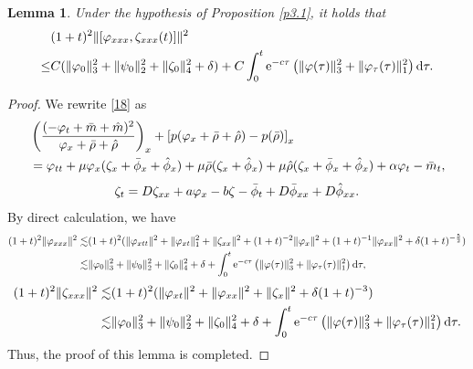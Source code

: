 \documentclass[11pt]{article}
\theoremstyle{plain}
\newtheorem{lemma}{Lemma}[section]
\numberwithin{equation}{section}
\begin{document}
\begin{lemma}\label{lem53}
		Under the hypothesis of Proposition \ref{p3.1}, it holds that
		\begin{align}\label{13.72}
			&(1+t)^2\|[\varphi_{xxx},\zeta_{xxx}(t)]\|^2\notag\\ 
			\leq& C(\|\varphi_0\|_3^2+\|\psi_0\|_2^2+\|\zeta_0\|_4^2+\delta)+C\int_{0}^{t}{\rm e}^{-c\tau}\left(\|\varphi(\tau)\|_3^2+\|\varphi_{\tau}(\tau)\|_1^2\right){\rm d}\tau.
		\end{align}
	\end{lemma}
\begin{proof}
We rewrite \eqref{18} as
\begin{align}\notag
	&\displaystyle\left(\frac{(-\varphi_{t}+\bar m+\hat m)^2}{\varphi_x+\bar\rho+\hat\rho}\right)_{x}+\left[p(\varphi_x+\bar\rho+\hat\rho)-p(\bar\rho)\right]_{x}\notag\\
			&=\varphi_{tt}+\mu \varphi_x(\zeta_x+\bar\phi_x+\hat\phi_x)+\mu\bar\rho(\zeta_x+\hat\phi_x)+\mu\hat\rho(\zeta_x+\bar\phi_x+\hat\phi_x)+\alpha \varphi_{t}-\bar m_t,\notag
	\end{align}	
	\begin{align}
	\zeta_t=D\zeta_{xx}+a\varphi_x-b\zeta-\bar\phi_t+D\bar\phi_{xx}+D\hat\phi_{xx}.\notag
	\end{align}	
By direct calculation, we have
\begin{align}\label{13.73}
(1+t)^2\|\varphi_{xxx}\|^{2}\lesssim&(1+t)^2(\|\varphi_{xtt}\|^{2}+\|\varphi_{xt}\|_1^{2}+\|\zeta_{xx}\|^2+(1+t)^{-2}\|\varphi_{x}\|^2+(1+t)^{-1}\|\varphi_{xx}\|^2+\delta(1+t)^{-\frac{5}{2}})\notag\\
\lesssim& \|\varphi_0\|_3^2+\|\psi_0\|_2^2+\|\zeta_0\|_4^2+\delta+\int_{0}^{t}{\rm e}^{-c\tau}\left(\|\varphi(\tau)\|_3^2+\|\varphi_{\tau}(\tau)\|_1^2\right){\rm d}\tau,
\end{align}
\begin{align}\label{13.74}
(1+t)^2\|\zeta_{xxx}\|^{2}\lesssim&(1+t)^2(\|\varphi_{xt}\|^{2}+\|\varphi_{xx}\|^{2}+\|\zeta_{x}\|^2+\delta(1+t)^{-3})\notag\\
\lesssim& \|\varphi_0\|_3^2+\|\psi_0\|_2^2+\|\zeta_0\|_4^2+\delta+\int_{0}^{t}{\rm e}^{-c\tau}\left(\|\varphi(\tau)\|_3^2+\|\varphi_{\tau}(\tau)\|_1^2\right){\rm d}\tau.
\end{align}
Thus, the proof of this lemma is completed.
\end{proof}
	
\end{document}
